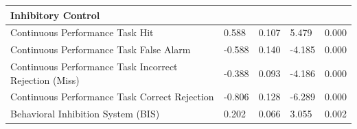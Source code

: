 \documentclass[utf8]{frontiersSCNS} %
\begin{document}
\begin{table}[]
\begin{tabular}{|l|l|l|l|l|}
Inhibitory Control                                             &          &            &         &                      \\ \hline
Continuous Performance Task Hit                                & 0.588    & 0.107      & 5.479   & 0.000                \\ \hline
Continuous Performance Task False Alarm                        & -0.588   & 0.140      & -4.185  & 0.000                \\ \hline
Continuous Performance Task Incorrect Rejection (Miss)         & -0.388   & 0.093      & -4.186  & 0.000                \\ \hline
Continuous Performance Task Correct Rejection                  & -0.806   & 0.128      & -6.289  & 0.000                \\ \hline
Behavioral Inhibition System (BIS)                             & 0.202    & 0.066      & 3.055   & 0.002                \\ \hline
\end{tabular}
\end{table}





\end{document}
